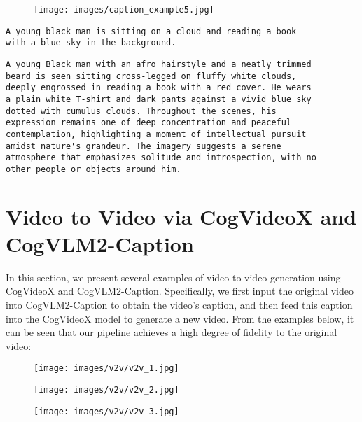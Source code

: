 \documentclass{article} \usepackage{iclr2024_conference,times}
\begin{document}
{\begin{figure}[h]
\begin{center}
\texttt{[image: images/caption\_example5.jpg]}
\end{center}
\end{figure} \begin{promptbox}
\begin{verbatim}
A young black man is sitting on a cloud and reading a book 
with a blue sky in the background.
\end{verbatim}
\end{promptbox}
\begin{promptbox}
\begin{verbatim}
A young Black man with an afro hairstyle and a neatly trimmed 
beard is seen sitting cross-legged on fluffy white clouds, 
deeply engrossed in reading a book with a red cover. He wears 
a plain white T-shirt and dark pants against a vivid blue sky 
dotted with cumulus clouds. Throughout the scenes, his 
expression remains one of deep concentration and peaceful 
contemplation, highlighting a moment of intellectual pursuit 
amidst nature's grandeur. The imagery suggests a serene 
atmosphere that emphasizes solitude and introspection, with no 
other people or objects around him.
\end{verbatim}
\end{promptbox}





%
 \clearpage
\section{Video to Video via CogVideoX and CogVLM2-Caption}
\label{ap:v2v}

In this section, we present several examples of video-to-video generation using CogVideoX and CogVLM2-Caption. Specifically, we first input the original video into CogVLM2-Caption to obtain the video's caption, and then feed this caption into the CogVideoX model to generate a new video. From the examples below, it can be seen that our pipeline achieves a high degree of fidelity to the original video:

\begin{figure}[h]
\begin{center}
\texttt{[image: images/v2v/v2v\_1.jpg]}
\end{center}
\end{figure}
 \begin{figure}[h]
\begin{center}
\texttt{[image: images/v2v/v2v\_2.jpg]}
\end{center}
\end{figure}
 \begin{figure}[h]
\begin{center}
\texttt{[image: images/v2v/v2v\_3.jpg]}
\end{center}
\end{figure}
  \clearpage
}
\end{document}
